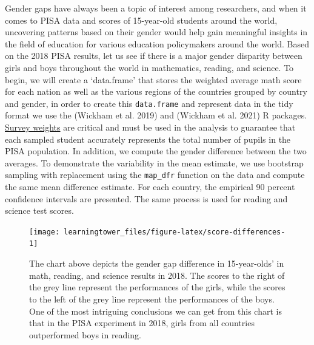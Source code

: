 Gender gaps have always been a topic of interest among researchers, and when it comes to PISA data and scores of 15-year-old students around the world, uncovering patterns based on their gender would help gain meaningful insights in the field of education for various education policymakers around the world. Based on the 2018 PISA results, let us see if there is a major gender disparity between girls and boys throughout the world in mathematics, reading, and science. To begin, we will create a `data.frame' that stores the weighted average math score for each nation as well as the various regions of the countries grouped by country and gender, in order to create this \texttt{data.frame} and represent data in the tidy format we use the  (Wickham et al. 2019) and  (Wickham et al. 2021) R packages. \href{https://www.oecd.org/pisa/data/2015-technical-report/PISA-2015-Technical-Report-Chapter-8-Survey-Weighting.pdf}{Survey weights} are critical and must be used in the analysis to guarantee that each sampled student accurately represents the total number of pupils in the PISA population. In addition, we compute the gender difference between the two averages. To demonstrate the variability in the mean estimate, we use bootstrap sampling with replacement using the \texttt{map\_dfr} function on the data and compute the same mean difference estimate. For each country, the empirical 90 percent confidence intervals are presented. The same process is used for reading and science test scores.

\begin{figure}[H]
\texttt{[image: learningtower\_files/figure-latex/score-differences-1]} \caption{The chart above depicts the gender gap difference in 15-year-olds' in math, reading, and science results in 2018. The scores to the right of the grey line represent the performances of the girls, while the scores to the left of the grey line represent the performances of the boys. One of the most intriguing conclusions we can get from this chart is that in the PISA experiment in 2018, girls from all countries outperformed boys in reading.}\label{fig:score-differences}
\end{figure}

